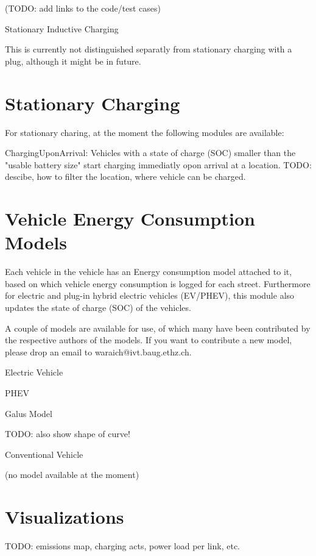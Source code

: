 \documentclass[a4paper,11pt]{report}
\begin{document}
(TODO: add links to the code/test cases)



Stationary Inductive Charging

This is currently not distinguished separatly from stationary charging with a plug, although it might be in future.

\vfill\eject
\section{Stationary Charging}

For stationary charing, at the moment the following modules are available:

ChargingUponArrival: Vehicles with a state of charge (SOC) smaller  than the "usable battery size" start charging immediatly opon arrival at  a location. TODO: descibe, how to filter the location, where vehicle  can be charged.

\vfill\eject
\section{Vehicle Energy Consumption Models}

Each  vehicle in the vehicle has an Energy consumption model attached to it,  based on which vehicle energy consumption is logged for each street.  Furthermore for electric and plug-in hybrid electric vehicles (EV/PHEV),  this module also updates the state of charge (SOC) of the vehicles.

A couple of models are available for use, of which many have been  contributed by the respective authors of the models. If you want to  contribute a new model, please drop an email to  waraich@ivt.baug.ethz.ch.

Electric Vehicle



PHEV

Galus Model

TODO: also show shape of curve!



Conventional Vehicle

(no model available at the moment)



\vfill\eject
\section{Visualizations}

TODO: emissions map, charging acts, power load per link, etc.
\end{document}
